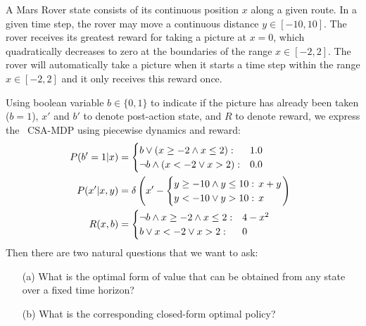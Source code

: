 \begin{example*}[\MarsRover]
\label{ex:marsrover}
A Mars Rover state consists of its continuous position $x$ along a
given route.  In a given time step, the rover may move a 
continuous distance $y \in [-10,10]$.  The rover receives its greatest
reward for taking a picture at $x=0$, which quadratically decreases
to zero at the boundaries of the range $x \in [-2,2]$.  The rover will
automatically take a picture when it starts a time step within the
range $x \in [-2,2]$ and it only receives this reward once.
\end{example*}
Using boolean variable $b \in \{0,1\}$ to indicate if the picture has
already been taken ($b=1$), $x'$ and $b'$ to denote 
post-action state, and $R$ to denote reward, we 
express the \MarsRover\ CSA-MDP using piecewise dynamics and reward:
\begin{align} 
\hspace{-2mm} P(b'=1|x) & = 
\begin{cases}
b \lor (x \geq -2 \land x \leq 2): & 1.0\\
\neg b \land (x < -2 \lor x > 2):  & 0.0
\end{cases} \label{eq:mr_discrete_trans} \\
\hspace{-2mm} P(x'|x,y) & = \delta \left( x' - \begin{cases}
y \geq -10 \land y \leq 10 : & \hspace{-2mm} x + y \\
y < -10 \lor y > 10 : & \hspace{-2mm} x
\end{cases}
\right) \label{eq:mr_cont_trans} \\
\hspace{-2mm} R(x,b) & = \begin{cases}
\neg b \land x \geq -2 \land x \leq 2 : & 4 - x^2 \\
b \lor x < -2 \lor x > 2 : & 0
\end{cases} \label{eq:mr_reward}
\end{align}
Then there are two natural questions that we want to ask:
\begin{enumerate}
\item[(a)] What is the optimal form of value that can be 
obtained from any state over a fixed time horizon?
\item[(b)] What is the corresponding closed-form optimal policy?
\end{enumerate}

